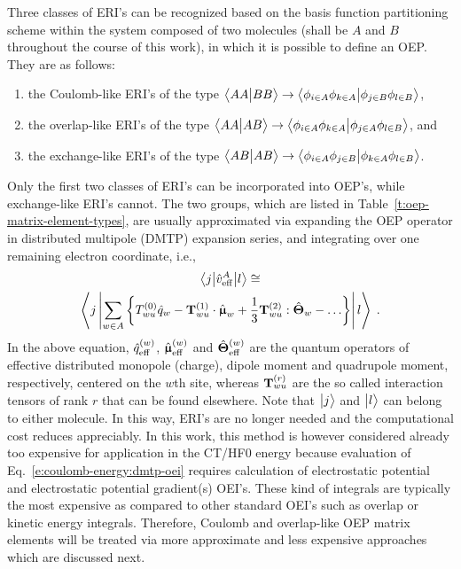 Three classes of ERI's can be recognized 
based on the basis function partitioning scheme
within the system composed of two molecules (shall be $A$ and $B$
throughout the course of this work),
in which it is possible to define an OEP. 
They are as follows:
%
\begin{enumerate}
\item the Coulomb\hyp{}like ERI's of the type 
$\BraKet{AA}{BB}\rightarrow \BraKet{\phi_{i\in A}\phi_{k\in A}}{\phi_{j\in B}\phi_{l\in B}}$,
\item the overlap\hyp{}like ERI's of the type 
$\BraKet{AA}{AB}\rightarrow \BraKet{\phi_{i\in A}\phi_{k\in A}}{\phi_{j\in A}\phi_{l\in B}}$, and
\item the exchange\hyp{}like ERI's of the type 
$\BraKet{AB}{AB}\rightarrow \BraKet{\phi_{i\in A}\phi_{j\in B}}{\phi_{k\in A}\phi_{l\in B}}$.
\end{enumerate}
%
Only the first two classes of ERI's can be incorporated into OEP's,
while exchange\hyp{}like ERI's cannot.
The two groups, which are listed in Table~\ref{t:oep-matrix-element-types},
are usually approximated via
expanding the OEP operator in distributed multipole (DMTP) expansion series, and integrating over
one remaining electron coordinate,\cite{Li.Gordon.Jensen.JCP.2006} i.e.,
%
\begin{multline} \label{e:coulomb-energy:dmtp-oei}
 \tBraKet{j}{\hat{v}_{\rm eff}^A}{l} \cong \\
 \left< j \left| 
                   \sum_{w\in A} \left\{
                                 T^{(0)}_{wu} \hat{q}_w 
                          - {\bf T}^{(1)}_{wu} \cdot \hat{\BM\upmu}_w 
            + \frac{1}{3}   {\bf T}^{(2)}_{wu} :     \hat{\BM\Theta}_w 
                    - \ldots  \right\}
              \right| l \right> \;.
\end{multline}
%
In the above equation, $\hat{q}_{\rm eff}^{(w)}$,
$\hat{\BM\upmu}^{(w)}_{\rm eff}$ and $\hat{\BM\Theta}^{(w)}_{\rm eff}$
are the quantum operators of effective distributed monopole (charge),
dipole moment and quadrupole moment, respectively, centered on the $w$th site, 
whereas ${{\bf T}^{(r)}_{wu}}$ are the so called interaction tensors of rank $r$ 
that can be found elsewhere.\cite{Blasiak.Cho.JCP.2014}
Note that $\Ket{j}$ and $\Ket{l}$ can belong to either molecule.
In this way, ERI's are no longer needed and the computational cost reduces appreciably.
In this work, this method is however considered already too expensive
for application in the CT/HF0 energy because evaluation of
Eq.~\eqref{e:coulomb-energy:dmtp-oei} requires calculation
of electrostatic potential and electrostatic potential gradient(s) OEI's. These kind of
integrals are typically the most expensive as compared to other standard OEI's
such as overlap or kinetic energy integrals.
Therefore, Coulomb and overlap\hyp{}like OEP matrix elements
will be treated via more approximate and less expensive approaches
which are discussed next.

